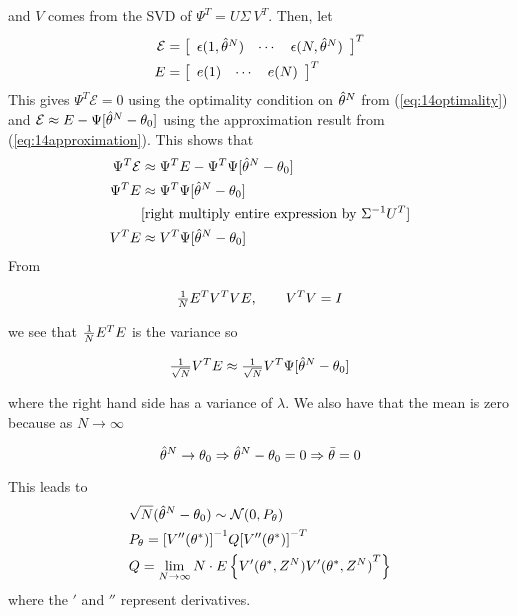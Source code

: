 and $V$ comes from the SVD of $\Psi^T=U\Sigma~V^T$.
Then, let
\begin{align*}
\mathcal{E} &= \left[\begin{array}{c c c} \epsilon(1,\hat{\theta}^N) & \cdots & \epsilon(N,\hat{\theta}^N) \end{array}\right]^T \\
E &= \left[\begin{array}{c c c} e(1) & \cdots & e(N) \end{array}\right]^T
\end{align*}
This gives $\Psi^T\mathcal{E} = 0$ using the optimality condition on $\hat{\theta}^N$ from (\ref{eq:14optimality}) and $\mathcal{E} \approx E-\Psi[\hat{\theta}^N-\theta_0]$ using the approximation result from (\ref{eq:14approximation}).
This shows that
\begin{align*}
\Psi^T\mathcal{E} &\approx \Psi^T E-\Psi^T\Psi[\hat{\theta}^N-\theta_0] \\
\Psi^T E &\approx \Psi^T\Psi[\hat{\theta}^N-\theta_0] \\
&[\text{right multiply entire expression by } \Sigma^{-1}U^T] \\
V^T E &\approx V^T\Psi[\hat{\theta}^N-\theta_0]
\end{align*}
From

\begin{equation*}
\tfrac{1}{N} E^T V^T VE, \qquad V^T V=I
\end{equation*}

we see that $\frac{1}{N} E^T E$ is the variance so

\begin{equation*}
\tfrac{1}{\sqrt{N}}V^T E \approx \tfrac{1}{\sqrt{N}}V^T\Psi[\hat{\theta}^N-\theta_0]
\end{equation*}

where the right hand side has a variance of $\lambda$.
We also have that the mean is zero because as $N\to\infty$

\begin{equation*}
\hat{\theta}^N\to\theta_0 \Rightarrow \hat{\theta}^N-\theta_0 = 0 \Rightarrow \bar{\theta} = 0
\end{equation*}

This leads to
\begin{align}
\begin{split}
&\sqrt{N}(\hat{\theta}^N-\theta_0) \sim \mathcal{N}(0,P_\theta) \\
&P_\theta = {\left[V''(\theta^\ast)\right]}^{-1}Q{\left[V''(\theta^\ast)\right]}^{-T} \\
&Q = \lim_{N\to\infty}N\cdot E\left\lbrace V'(\theta^\ast,Z^N)V'{(\theta^\ast,Z^N)}^T \right\rbrace
\end{split}
\end{align}
where the $'$ and $''$ represent derivatives.


